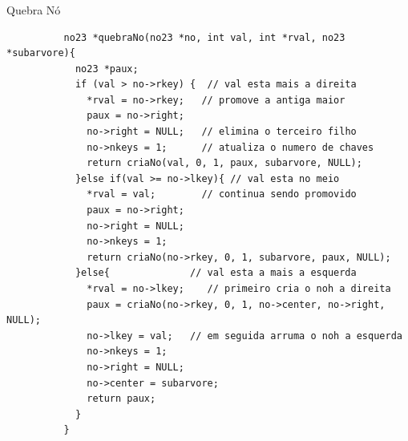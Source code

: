 \documentclass[cyan,compress,aspectratio=43]{beamer}
\begin{document}
\begin{frame}[fragile]
\frametitle{}
      \vspace{-0.2cm}
	\begin{block}{Quebra Nó}
		\begin{lstlisting}
		  no23 *quebraNo(no23 *no, int val, int *rval, no23 *subarvore){
		    no23 *paux;
		    if (val > no->rkey) {  // val esta mais a direita
		      *rval = no->rkey;   // promove a antiga maior
		      paux = no->right;
		      no->right = NULL;   // elimina o terceiro filho
		      no->nkeys = 1;      // atualiza o numero de chaves
		      return criaNo(val, 0, 1, paux, subarvore, NULL);
		    }else if(val >= no->lkey){ // val esta no meio
		      *rval = val;        // continua sendo promovido
		      paux = no->right;
		      no->right = NULL;
		      no->nkeys = 1;
		      return criaNo(no->rkey, 0, 1, subarvore, paux, NULL);
		    }else{              // val esta a mais a esquerda
		      *rval = no->lkey;    // primeiro cria o noh a direita
		      paux = criaNo(no->rkey, 0, 1, no->center, no->right, NULL);
		      no->lkey = val;   // em seguida arruma o noh a esquerda
		      no->nkeys = 1;
		      no->right = NULL;
		      no->center = subarvore;
		      return paux;
		    }
		  }
	  \end{lstlisting}

  	\end{block}      
\end{frame}


%		
\end{document}
